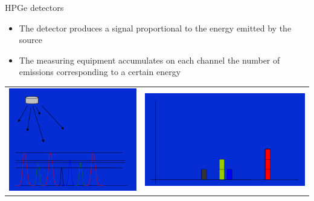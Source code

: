 \begin{frame}{HPGe detectors}

\begin{exampleblock}{}

\begin{itemize}
\item The detector produces a signal proportional to the energy emitted by the source
\item The measuring equipment accumulates on each channel the number of emissions corresponding to a certain energy
\end{itemize}

\end{exampleblock}

\pause
\begin{table}
\begin{tabular}{cc}
\includegraphics[scale=0.2]{figures/schemedetection1.png} & \includegraphics[scale=0.2]{figures/detectionsystem2.png}
\end{tabular}
\end{table}

\end{frame}


